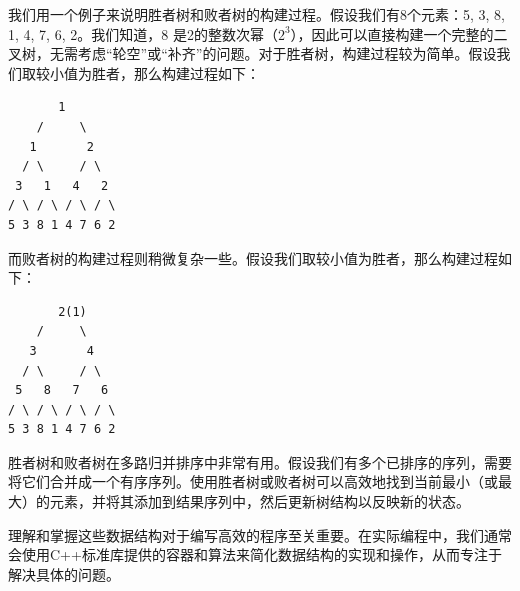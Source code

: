 我们用一个例子来说明胜者树和败者树的构建过程。假设我们有8个元素：5, 3, 8, 1, 4, 7, 6, 2。我们知道，8 是2的整数次幂（$2^3$），因此可以直接构建一个完整的二叉树，无需考虑“轮空”或“补齐”的问题。对于胜者树，构建过程较为简单。假设我们取较小值为胜者，那么构建过程如下：
\begin{verbatim}
       1
    /     \
   1       2
  / \     / \
 3   1   4   2
/ \ / \ / \ / \
5 3 8 1 4 7 6 2
\end{verbatim}
而败者树的构建过程则稍微复杂一些。假设我们取较小值为胜者，那么构建过程如下：
\begin{verbatim}
       2(1)
    /     \
   3       4
  / \     / \
 5   8   7   6
/ \ / \ / \ / \
5 3 8 1 4 7 6 2
\end{verbatim}
胜者树和败者树在多路归并排序中非常有用。假设我们有多个已排序的序列，需要将它们合并成一个有序序列。使用胜者树或败者树可以高效地找到当前最小（或最大）的元素，并将其添加到结果序列中，然后更新树结构以反映新的状态。

理解和掌握这些数据结构对于编写高效的程序至关重要。在实际编程中，我们通常会使用C++标准库提供的容器和算法来简化数据结构的实现和操作，从而专注于解决具体的问题。